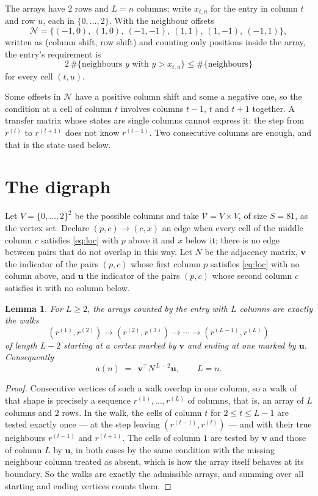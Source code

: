 \documentclass[11pt,a4paper]{article}
\theoremstyle{plain}
\newtheorem{lemma}[theorem]{Lemma}
\theoremstyle{definition}
\begin{document}
The arrays have $2$ rows and $L=n$ columns; write $x_{t,u}$ for the entry in
column $t$ and row $u$, each in $\{0,\dots,2\}$. With the neighbour offsets
\[
\mathcal N=\{(-1,0),\ (1,0),\ (-1,-1),\ (1,1),\ (1,-1),\ (-1,1)\},
\]
written as (column shift, row shift) and counting only positions inside the array, the
entry's requirement is
\begin{equation}\label{eq:loc}
2\,\#\{\text{neighbours }y\text{ with }y>x_{t,u}\}\le\#\{\text{neighbours}\}
\end{equation}
for every cell $(t,u)$.

Some offsets in $\mathcal N$ have a positive column shift and some a negative one, so the
condition at a cell of column $t$ involves columns $t-1$, $t$ and $t+1$ together. A transfer
matrix whose states are single columns cannot express it: the step from $r^{(t)}$ to
$r^{(t+1)}$ does not know $r^{(t-1)}$. Two consecutive columns are enough, and that is
the state used below.

\section{The digraph}

Let $V=\{0,\dots,2\}^{2}$ be the possible columns and take
$\mathcal V=V\times V$, of size $S=81$, as the vertex set. Declare $(p,c)\to(c,x)$ an edge
when every cell of the middle column $c$ satisfies \eqref{eq:loc} with $p$ above it and $x$
below it; there is no edge between pairs that do not overlap in this way. Let $N$ be the
adjacency matrix, $\mathbf{v}$ the indicator of the pairs $(p,c)$ whose first column $p$
satisfies \eqref{eq:loc} with no column above, and $\mathbf{u}$ the indicator of
the pairs $(p,c)$ whose second column $c$ satisfies it with no column below.

\begin{lemma}\label{lem:walk}
For $L\ge2$, the arrays counted by the entry with $L$ columns are exactly the walks
\[
(r^{(1)},r^{(2)})\to(r^{(2)},r^{(3)})\to\cdots\to(r^{(L-1)},r^{(L)})
\]
of length $L-2$ starting at a vertex marked by $\mathbf{v}$ and ending at one marked by
$\mathbf{u}$. Consequently
\[
a(n)\;=\;\,\mathbf{v}^{\!\top}N^{\,L-2}\mathbf{u},\qquad L=n .
\]
\end{lemma}

\begin{proof}
Consecutive vertices of such a walk overlap in one column, so a walk of that shape is
precisely a sequence $r^{(1)},\dots,r^{(L)}$ of columns, that is, an array of $L$ columns
and $2$ rows. In the walk, the cells of column $t$ for $2\le t\le L-1$ are tested
exactly once --- at the step leaving $(r^{(t-1)},r^{(t)})$ --- and with their true
neighbours $r^{(t-1)}$ and $r^{(t+1)}$. The cells of column $1$ are tested by
$\mathbf{v}$ and those of column $L$ by $\mathbf{u}$, in both cases by the same condition
with the missing neighbour column treated as absent, which is how the array itself behaves at
its boundary. So the walks are exactly the admissible arrays, and summing over all starting
and ending vertices counts them.
\end{proof}
\end{document}
